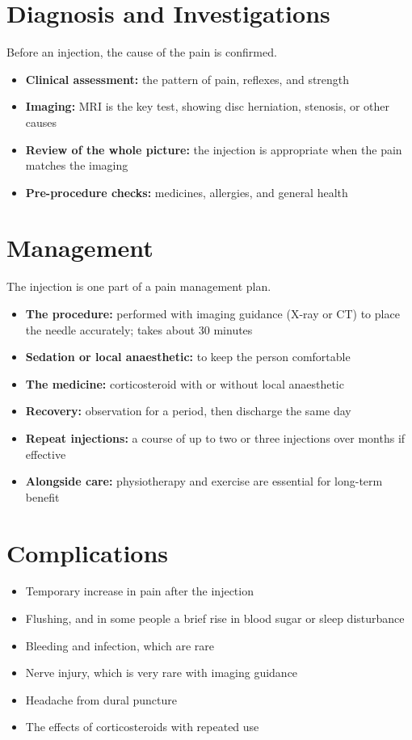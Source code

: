 \section*{Diagnosis and Investigations}
Before an injection, the cause of the pain is confirmed.
\begin{itemize}
    \item \textbf{Clinical assessment:} the pattern of pain, reflexes, and strength
    \item \textbf{Imaging:} MRI is the key test, showing disc herniation, stenosis, or other causes
    \item \textbf{Review of the whole picture:} the injection is appropriate when the pain matches the imaging
    \item \textbf{Pre-procedure checks:} medicines, allergies, and general health
\end{itemize}

\section*{Management}
The injection is one part of a pain management plan.
\begin{itemize}
    \item \textbf{The procedure:} performed with imaging guidance (X-ray or CT) to place the needle accurately; takes about 30 minutes
    \item \textbf{Sedation or local anaesthetic:} to keep the person comfortable
    \item \textbf{The medicine:} corticosteroid with or without local anaesthetic
    \item \textbf{Recovery:} observation for a period, then discharge the same day
    \item \textbf{Repeat injections:} a course of up to two or three injections over months if effective
    \item \textbf{Alongside care:} physiotherapy and exercise are essential for long-term benefit
\end{itemize}

\section*{Complications}
\begin{itemize}
    \item Temporary increase in pain after the injection
    \item Flushing, and in some people a brief rise in blood sugar or sleep disturbance
    \item Bleeding and infection, which are rare
    \item Nerve injury, which is very rare with imaging guidance
    \item Headache from dural puncture
    \item The effects of corticosteroids with repeated use
\end{itemize}

